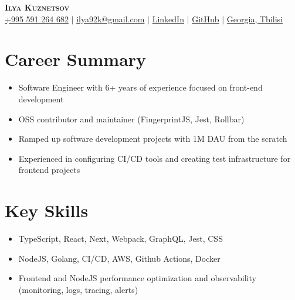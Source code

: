 \documentclass[letterpaper,11pt]{article}
\newcommand{\resumeItem}[1]{
  \item\small{
    {#1 \vspace{-2pt}}
  }
}
\newcommand{\resumeItemListStart}{\begin{itemize}}
\newcommand{\resumeItemListEnd}{\end{itemize}\vspace{-5pt}}
\begin{document}

\begin{center}
    \textbf{\Huge \scshape Ilya Kuznetsov} \\ \vspace{3pt}
    \small
    \faMobile \hspace{.5pt} \href{tel:995591264682}{+995 591 264 682}
    $|$
    \faAt \hspace{.5pt} \href{mailto:ilya92k@gmail.com}{ilya92k@gmail.com}
    $|$
    \faLinkedinSquare \hspace{.5pt} \href{https://www.linkedin.com/in/ilya-kuznetsov-frontend}{LinkedIn}
    $|$
    \faGithub \hspace{.5pt} \href{https://github.com/dj-stormtrooper}{GitHub}
    $|$
    \faMapMarker \hspace{.5pt} \href{https://goo.gl/maps/DxtDYXA3ihT92Ffm6}{Georgia, Tbilisi}
\end{center}



\section{Career Summary}
  \vspace{3pt}
  \resumeItemListStart
    \resumeItem{Software Engineer with 6+ years of experience focused on front-end development}
    \resumeItem{OSS contributor and maintainer (FingerprintJS, Jest, Rollbar)}
    \resumeItem{Ramped up software development projects with 1M DAU from the scratch}
    \resumeItem{Experienced in configuring CI/CD tools and creating test infrastructure for frontend projects}
  \resumeItemListEnd


\section{Key Skills}
\vspace{3pt}
\resumeItemListStart
  \resumeItem{TypeScript, React, Next, Webpack, GraphQL, Jest, CSS}
  \resumeItem{NodeJS, Golang, CI/CD, AWS, Github Actions, Docker}
  \resumeItem{Frontend and NodeJS performance optimization and observability (monitoring, logs, tracing, alerts)}
\resumeItemListEnd

\end{document}
